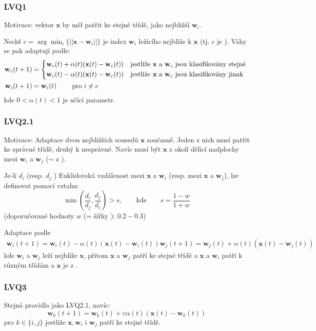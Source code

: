 \documentclass[11pt]{report} %
\renewcommand{\vec}[1]{\mathbf{#1}}
\numberwithin{equation}{section}
\begin{document}
\subsubsection{LVQ1} 
Motivace: vektor $\vec{x}$ by měl patřit ke stejné třídě, jako nejbližší $\vec{w}_i$. 

Nechť $c = \arg \min_{i}\{||\vec{x} - \vec{w}_i||\}$ je index $\vec{w}_i$ ležícího nejblíže k $\vec{x}$ (tj. $c$ je ). Váhy se pak adaptují podle:
\begin{align*}
	\vec{w}_c(t+1) &= 
	\begin{dcases*}
	\vec{w}_c(t) + \alpha(t)(\vec{x}(t) - \vec{w}_c(t)) & jestliže $\vec{x}$ a $\vec{w}_c$ jsou klasifikovány stejně \\
	\vec{w}_c(t) - \alpha(t)(\vec{x}(t) - \vec{w}_c(t)) & jestliže $\vec{x}$ a $\vec{w}_c$ jsou klasifikovány jinak \\
	\end{dcases*}	\\
	\vec{w}_i(t+1) &= \vec{w}_i(t)\qquad \text{ pro $i \neq c$}\\
\end{align*}
kde $0 < \alpha(t) < 1$ je učící parametr.

\subsubsection{LVQ2.1} Motivace: Adaptace dvou nejbližších sousedů $\vec{x}$ současně. Jeden z nich musí patřit ke správné třídě, druhý k nesprávné. Navíc musí být $\vec{x}$ z okolí dělicí nadplochy mezi $\vec{w}_i$ a $\vec{w}_j$ ($\sim$ z ).
	
Je-li $d_i$ (resp. $d_j$ ) Euklidovská vzdálenost mezi $\vec{x}$ a $\vec{w}_i$ (resp. mezi $\vec{x}$ a $\vec{w}_j$), lze  definovat pomocí vztahu:
$$\min\left(\frac{d_i}{d_j},\frac{d_j}{d_i} \right) > s, \qquad \text{kde}\qquad s = \frac{1-w}{1+w}$$	
(doporučované hodnoty $w$ (= šířky ): $0.2 - 0.3$)
	
Adaptace podle
\begin{align*}
\vec{w}_i(t+1) = \vec{w}_i(t) - \alpha(t)(\vec{x}(t) - \vec{w}_i(t))		
\vec{w}_j(t+1) = \vec{w}_j(t) + \alpha(t)(\vec{x}(t) - \vec{w}_j(t))
\end{align*}
kde $\vec{w}_i$ a $\vec{w}_j$ leží nejblíže $\vec{x}$, přitom $\vec{x}$ a $\vec{w}_j$ patří ke stejné třídě a $\vec{x}$ a $\vec{w}_i$ patří k různým třídám a $\vec{x}$ je z .

\subsubsection{LVQ3} 
Stejná pravidla jako LVQ2.1, navíc:
$$\vec{w}_k(t+1) = \vec{w}_k(t) + \varepsilon\alpha(t)(\vec{x}(t) - \vec{w}_k(t))$$
pro $k\in \{i,j\}$ jestliže $\vec{x}, \vec{w}_i$ i $\vec{w}_j$ patří ke stejné třídě.
\end{document}
